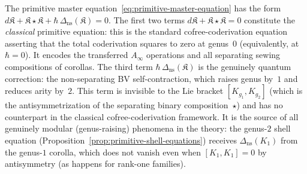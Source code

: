 \begin{remark}
\label{rem:quantum-primitive-equation}
The primitive master equation~\eqref{eq:primitive-master-equation}
has the form
$d\mathfrak{K} + \mathfrak{K} \star \mathfrak{K}
+ \hbar\,\Delta_{\mathrm{ns}}(\mathfrak{K}) = 0$.
The first two terms
$d\mathfrak{K} + \mathfrak{K} \star \mathfrak{K} = 0$
constitute the \emph{classical} primitive equation: this is the
standard cofree-coderivation equation asserting that the total
coderivation squares to zero at genus~$0$ (equivalently, at
$\hbar = 0$).  It encodes the transferred $A_\infty$ operations
and all separating sewing compositions of corollas.  The third
term $\hbar\,\Delta_{\mathrm{ns}}(\mathfrak{K})$ is the
genuinely quantum correction: the non-separating BV
self-contraction, which raises genus by~$1$ and reduces arity
by~$2$.  This term is invisible to the Lie bracket
$[K_{g_1}, K_{g_2}]$ (which is the antisymmetrization of the
separating binary composition~$\star$) and has no counterpart
in the classical cofree-coderivation framework.  It is the
source of all genuinely modular (genus-raising) phenomena in
the theory: the genus-$2$ shell equation
(Proposition~\ref{prop:primitive-shell-equations}) receives
$\Delta_{\mathrm{ns}}(K_1)$ from the genus-$1$ corolla, which
does not vanish even when $[K_1, K_1] = 0$ by antisymmetry
(as happens for rank-one families).
\end{remark}

